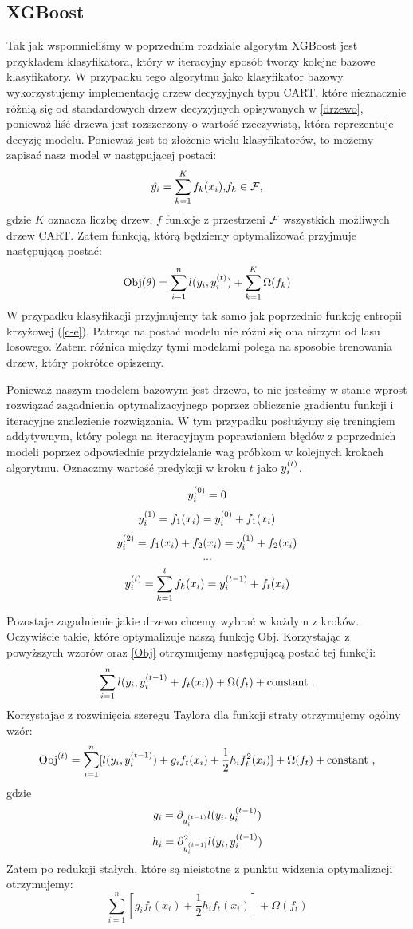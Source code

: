 \documentclass{book}
\begin{document}
\subsection{XGBoost}
	Tak jak wspomnieliśmy w poprzednim rozdziale algorytm XGBoost jest przykładem klasyfikatora, który w iteracyjny sposób tworzy kolejne bazowe klasyfikatory. W przypadku tego algorytmu jako klasyfikator bazowy wykorzystujemy implementację drzew decyzyjnych typu CART, które nieznacznie różnią się od standardowych drzew decyzyjnych opisywanych w \ref{drzewo}, ponieważ liść drzewa jest rozszerzony o wartość rzeczywistą, która reprezentuje decyzję modelu. Ponieważ jest to złożenie wielu klasyfikatorów, to możemy zapisać nasz model w następującej postaci:
	$$ \hat{y_i} = \sum_{k=1}^K f_k(x_i) \text{,} f_k \in \mathcal{F} \text{,} $$
	gdzie $K$ oznacza liczbę drzew, $f$ funkcje z przestrzeni $\mathcal{F}$ wszystkich możliwych drzew CART.
	Zatem funkcją, którą będziemy optymalizować przyjmuje następującą postać:
	\begin{equation}
	\label{Obj}
		\text{Obj}(\theta) = \sum_{i=1}^{n} l(y_i, y_i^{(t)}) + \sum_{k=1}^{K} \Omega(f_k)
	\end{equation}
	W przypadku klasyfikacji przyjmujemy tak samo jak poprzednio funkcję entropii krzyżowej (\ref{c-e}).
	Patrząc na postać modelu nie różni się ona niczym od lasu losowego. Zatem różnica między tymi modelami polega na sposobie trenowania drzew, który pokrótce opiszemy.
	
	Ponieważ naszym modelem bazowym jest drzewo, to nie jesteśmy w stanie wprost rozwiązać zagadnienia optymalizacyjnego poprzez obliczenie gradientu funkcji i iteracyjne znalezienie rozwiązania. W tym przypadku posłużymy się treningiem addytywnym, który polega na iteracyjnym poprawianiem błędów z poprzednich modeli poprzez odpowiednie przydzielanie wag próbkom w kolejnych krokach algorytmu. 
	Oznaczmy wartość predykcji w kroku $t$ jako $y_i^{(t)}$.
	
	 $$ y_i^{(0)} = 0 $$
	 $$ y_i^{(1)} = f_1(x_i)  = y_i^{(0)} + f_1(x_i) $$
	 $$ y_i^{(2)} = f_1(x_i) + f_2(x_i) = y_i^{(1)} + f_2(x_i) $$
	 $$ ... $$
	 $$ y_i^{(t)} = \sum_{k=1}^{t} f_k(x_i) = y_i^{(t-1)} + f_t(x_i) $$
	 
	 Pozostaje zagadnienie jakie drzewo chcemy wybrać w każdym z kroków. Oczywiście takie, które optymalizuje naszą funkcję Obj. Korzystając z powyższych wzorów oraz \ref{Obj} otrzymujemy następującą postać tej funkcji:
	 $$ \sum_{i=1}^{n} l(y_i, y_i^{(t-1)} + f_t(x_i)) + \Omega(f_t) + \text{constant .}$$
	 Korzystając z rozwinięcia szeregu Taylora dla funkcji straty otrzymujemy ogólny wzór:
	 $$ \text{Obj}^{(t)} = \sum_{i=1}^{n} [l(y_i, y_i^{(t-1)}) + g_i f_t(x_i) + \frac{1}{2} h_i f_t^2(x_i)] + \Omega(f_t) + \text{constant ,} $$
	 gdzie 
	 $$ g_i = \partial_{y_i^{(t-1)}} l(y_i, y_i^{(t-1)}) $$
	 $$ h_i = \partial^2_{y_i^{(t-1)}} l(y_i, y_i^{(t-1)}) $$
	 Zatem po redukcji stałych, które są nieistotne z punktu widzenia optymalizacji otrzymujemy:
	 $$ \sum_{i=1}^{n} [g_i f_t(x_i) + \frac{1}{2} h_i f_t(x_i)] + \Omega(f_t) $$
	 
\end{document}
